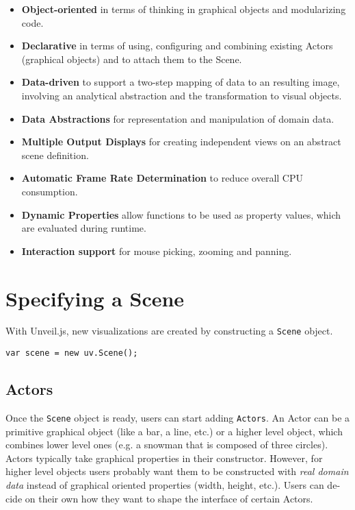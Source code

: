 \begin{english}
\begin{itemize}
\item
  \textbf{Object-oriented} in terms of thinking in graphical objects and modularizing code.
\item
  \textbf{Declarative} in terms of using, configuring and combining existing Actors (graphical objects) and to attach them to the Scene.
\item
  \textbf{Data-driven} to support a two-step mapping of data to an resulting image, involving an analytical abstraction and the transformation to visual objects.
\item
  \textbf{Data Abstractions} for representation and manipulation of domain data.
\item
  \textbf{Multiple Output Displays} for creating independent views on an abstract scene definition.
\item
  \textbf{Automatic Frame Rate Determination} to reduce overall CPU consumption.
\item
  \textbf{Dynamic Properties} allow functions to be used as property values, which are evaluated during runtime.
\item
  \textbf{Interaction support} for mouse picking, zooming and panning.
\end{itemize}


\section{Specifying a Scene}

With Unveil.js, new visualizations are created by constructing a \texttt{Scene} object.

\begin{verbatim}
var scene = new uv.Scene();
\end{verbatim}

\subsection{Actors}

Once the \texttt{Scene} object is ready, users can start adding \texttt{Actors}. An Actor can be a primitive graphical object (like a bar, a line, etc.) or a higher level object, which combines lower level ones (e.g. a snowman that is composed of three circles). Actors typically take graphical properties in their constructor. However, for higher level objects users probably want them to be constructed with \emph{real domain data} instead of graphical oriented properties (width, height, etc.). Users can decide on their own how they want to shape the interface of certain Actors.


\end{english}
